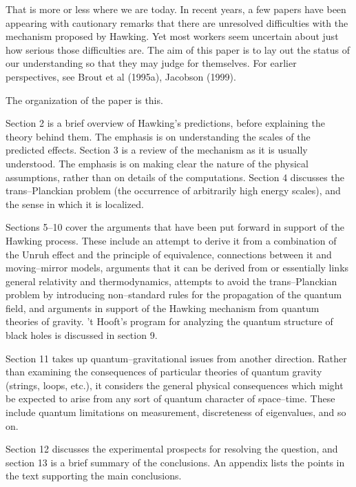 That is more or less where we are today.  In recent years, a few papers have
been appearing with cautionary remarks that there are unresolved difficulties
with the mechanism proposed by Hawking.  
Yet most workers seem uncertain about just how serious those difficulties are. 
The aim of this paper is to lay out the status of our understanding so that
they may judge for themselves.  
For earlier perspectives, see Brout et al
(1995a), Jacobson (1999).

The organization of the paper is this.

Section 2 is a brief overview of Hawking's predictions, before explaining the
theory behind them.  The emphasis is on understanding the scales of the
predicted effects.    Section 3 is a review of the mechanism as it is usually
understood.  The emphasis is on making clear the nature of the physical
assumptions, rather than on details of the computations.   Section 4 discusses
the trans--Planckian problem (the occurrence of arbitrarily high energy
scales), and the sense in which it is localized.  

Sections 5--10 cover the arguments that have been put forward in
support of the Hawking process.  These include an attempt to derive it
from a combination of the Unruh effect and the principle of equivalence,
connections between it and moving--mirror models, arguments that it
can be derived from or essentially links general relativity and
thermodynamics, attempts to avoid the trans--Planckian problem by
introducing non--standard rules for the propagation of the quantum
field, and arguments in support of the Hawking mechanism from quantum
theories of gravity.  't Hooft's program for analyzing the
quantum structure of black holes is discussed in section 9.

Section 11 takes up quantum--gravitational issues from another
direction.  Rather than examining the consequences of particular
theories of quantum gravity (strings, loops, etc.), it considers the
general physical consequences which might be expected to arise from
any sort of quantum character of space--time.  These include quantum
limitations on measurement, discreteness of eigenvalues, and so on.

Section 12 discusses the experimental prospects for resolving the
question, and section 13 is a brief summary of the conclusions.
An appendix lists the points in the text supporting the main conclusions.

\smallskip

